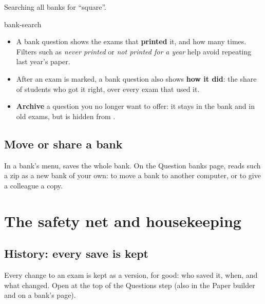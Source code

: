 \documentclass[11pt]{article}
\begin{document}
\begin{guidefig}{Searching all banks for ``square''.}
\begin{shot}[0.9\linewidth]{bank-search}
\end{shot}
\end{guidefig}

\begin{itemize}
  \item A bank question shows the exams that \textbf{printed} it, and how many times. Filters such as \emph{never printed} or \emph{not printed for a year} help avoid repeating last year's paper.
  \item After an exam is marked, a bank question also shows \textbf{how it did}: the share of students who got it right, over every exam that used it.
  \item \textbf{Archive} a question you no longer want to offer: it stays in the bank and in old exams, but is hidden from .
\end{itemize}

\subsection{Move or share a bank}\label{sec:bank-move}

In a bank's \ui{$\cdots$} menu,  saves the whole bank. On the Question banks page,  reads such a zip as a new bank of your own: to move a bank to another computer, or to give a colleague a copy.

\section{The safety net and housekeeping}\label{sec:safety}

\subsection{History: every save is kept}\label{sec:history}

Every change to an exam is kept as a version, for good: who saved it, when, and what changed. Open  at the top of the Questions step (also in the Paper builder and on a bank's page).
\end{document}
